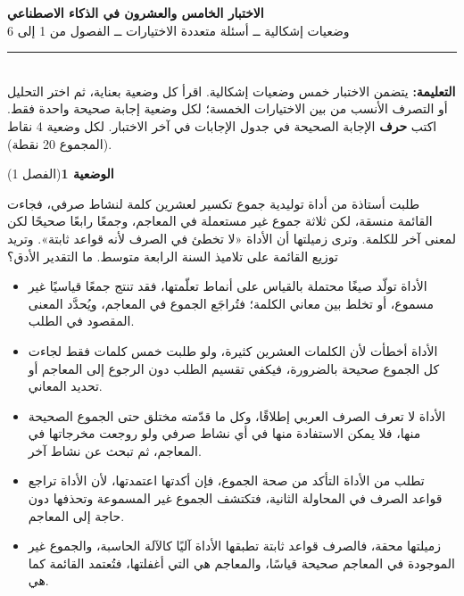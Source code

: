 \documentclass[11pt,a4paper]{article}
\begin{document}
\linespread{1.08}\selectfont
\begin{center}
{\LARGE\khatt\textbf{الاختبار الخامس والعشرون في الذكاء الاصطناعي}}\\[4pt]
{\normalsize وضعيات إشكالية ــ أسئلة متعددة الاختيارات ــ الفصول من 1 إلى 6}
\end{center}
\vspace{-2pt}\rule{\textwidth}{0.6pt}\\[2pt]
\textbf{التعليمة:} يتضمن الاختبار خمس وضعيات إشكالية. اقرأ كل وضعية بعناية، ثم اختر التحليل أو التصرف الأنسب
من بين الاختيارات الخمسة؛ لكل وضعية إجابة صحيحة واحدة فقط.
اكتب \textbf{حرف} الإجابة الصحيحة في جدول الإجابات في آخر الاختبار.
لكل وضعية 4 نقاط (المجموع 20 نقطة).
\vspace{4pt}

\noindent
{\large\khatt\textbf{الوضعية 1}}\hfill{\small(الفصل 1)}\par\nopagebreak\vspace{3pt}
\setlength{\fboxsep}{7pt}\colorbox{gray!10}{\parbox{\dimexpr\linewidth-14pt}{طلبت أستاذة من أداة توليدية جموع تكسير لعشرين كلمة لنشاط صرفي، فجاءت القائمة منسقة، لكن ثلاثة جموع غير مستعملة في المعاجم، وجمعًا رابعًا صحيحًا لكن لمعنى آخر للكلمة. وترى زميلتها أن الأداة «لا تخطئ في الصرف لأنه قواعد ثابتة». وتريد توزيع القائمة على تلاميذ السنة الرابعة متوسط. ما التقدير الأدق؟}}\par\nopagebreak
\begin{itemize}[leftmargin=1.0cm, labelsep=6pt, itemsep=3pt, topsep=4pt, parsep=0pt]
  \item[\textbf{أ)}] الأداة تولّد صيغًا محتملة بالقياس على أنماط تعلّمتها، فقد تنتج جمعًا قياسيًا غير مسموع، أو تخلط بين معاني الكلمة؛ فتُراجَع الجموع في المعاجم، ويُحدَّد المعنى المقصود في الطلب.
  \item[\textbf{ب)}] الأداة أخطأت لأن الكلمات العشرين كثيرة، ولو طلبت خمس كلمات فقط لجاءت كل الجموع صحيحة بالضرورة، فيكفي تقسيم الطلب دون الرجوع إلى المعاجم أو تحديد المعاني.
  \item[\textbf{ج)}] الأداة لا تعرف الصرف العربي إطلاقًا، وكل ما قدّمته مختلق حتى الجموع الصحيحة منها، فلا يمكن الاستفادة منها في أي نشاط صرفي ولو روجعت مخرجاتها في المعاجم، ثم تبحث عن نشاط آخر.
  \item[\textbf{د)}] تطلب من الأداة التأكد من صحة الجموع، فإن أكدتها اعتمدتها، لأن الأداة تراجع قواعد الصرف في المحاولة الثانية، فتكتشف الجموع غير المسموعة وتحذفها دون حاجة إلى المعاجم.
  \item[\textbf{هـ)}] زميلتها محقة، فالصرف قواعد ثابتة تطبقها الأداة آليًا كالآلة الحاسبة، والجموع غير الموجودة في المعاجم صحيحة قياسًا، والمعاجم هي التي أغفلتها، فتُعتمد القائمة كما هي.
\end{itemize}
\end{document}

